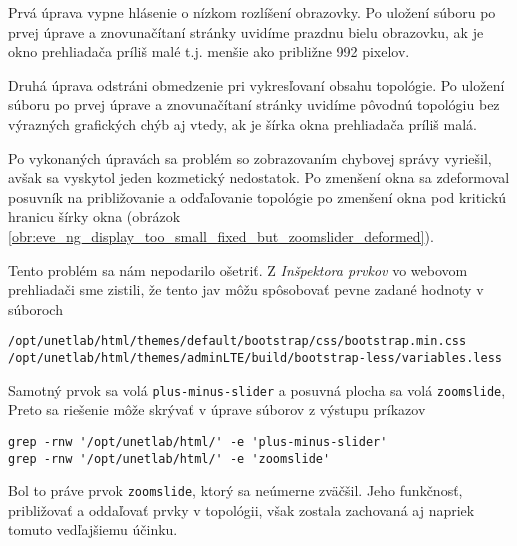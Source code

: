 Prvá úprava vypne hlásenie o nízkom rozlíšení obrazovky. Po uložení súboru po prvej úprave a znovunačítaní stránky uvidíme prazdnu bielu obrazovku, ak je okno prehliadača príliš malé t.j. menšie ako približne 992 pixelov.

Druhá úprava odstráni obmedzenie pri vykresľovaní obsahu topológie. Po uložení súboru po prvej úprave a znovunačítaní stránky uvidíme pôvodnú topológiu bez výrazných grafických chýb aj vtedy, ak je šírka okna prehliadača príliš malá.

Po vykonaných úpravách sa problém so zobrazovaním chybovej správy vyriešil, avšak sa vyskytol jeden kozmetický nedostatok. Po zmenšení okna sa zdeformoval posuvník na približovanie a odďaľovanie topológie po zmenšení okna pod kritickú hranicu šírky okna (obrázok \ref{obr:eve_ng_display_too_small_fixed_but_zoomslider_deformed}).


Tento problém sa nám nepodarilo ošetriť. Z \emph{Inšpektora prvkov} vo webovom prehliadači sme zistili, že tento jav môžu spôsobovať pevne zadané hodnoty v súboroch
\renewcommand\baselinestretch{1}
\begin{Verbatim}[samepage=true]
/opt/unetlab/html/themes/default/bootstrap/css/bootstrap.min.css
/opt/unetlab/html/themes/adminLTE/build/bootstrap-less/variables.less
\end{Verbatim}
\renewcommand\baselinestretch{1.5}

Samotný prvok sa volá \texttt{plus-minus-slider} a posuvná plocha sa volá \texttt{zoomslide}, Preto sa riešenie môže skrývať v úprave súborov z výstupu príkazov
\renewcommand\baselinestretch{1}
\begin{Verbatim}[samepage=true]
grep -rnw '/opt/unetlab/html/' -e 'plus-minus-slider'
grep -rnw '/opt/unetlab/html/' -e 'zoomslide'
\end{Verbatim}
\renewcommand\baselinestretch{1.5}

Bol to práve prvok \texttt{zoomslide}, ktorý sa neúmerne zväčšil. Jeho funkčnosť, približovať a oddaľovať prvky v topológii, však zostala zachovaná aj napriek tomuto vedľajšiemu účinku.

